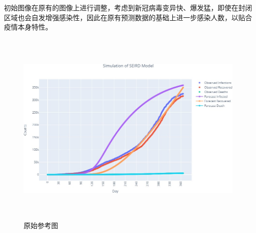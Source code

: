 \documentclass{cumcmthesis}
\begin{document}
初始图像在原有的图像上进行调整，考虑到新冠病毒变异快、爆发猛，即使在封闭区域也会自发增强感染性，因此在原有预测数据的基础上进一步感染人数，以贴合疫情本身特性。
\begin{figure}[!htp]
    \centering
    \includegraphics[width=15.6cm,height=9.64cm]{figures/original.png}
    \caption{原始参考图}
\end{figure}
\end{document}
